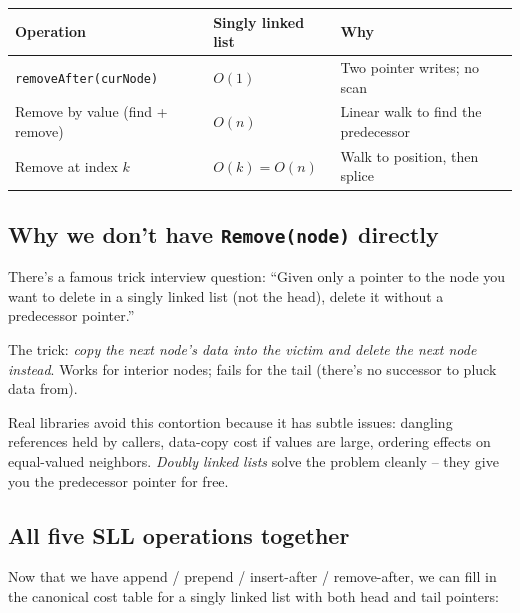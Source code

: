 \documentclass[11pt]{article}
\begin{document}
\begin{center}
\footnotesize
\renewcommand{\arraystretch}{1.3}
\begin{tabular}{@{}lll@{}}
\hline
\textbf{Operation}                & \textbf{Singly linked list} & \textbf{Why} \\
\hline
\texttt{removeAfter(curNode)}     & $O(1)$                      & Two pointer writes; no scan \\
Remove by value (find + remove)   & $O(n)$                      & Linear walk to find the predecessor \\
Remove at index $k$               & $O(k) = O(n)$               & Walk to position, then splice \\
\hline
\end{tabular}
\end{center}

\subsection{Why we don't have \texttt{Remove(node)} directly}

\begin{ideabox}
There's a famous trick interview question: ``Given only a pointer
to the node you want to delete in a singly linked list (not the
head), delete it without a predecessor pointer.''

The trick: \emph{copy the next node's data into the victim and
delete the next node instead}. Works for interior nodes; fails for
the tail (there's no successor to pluck data from).

Real libraries avoid this contortion because it has subtle issues:
dangling references held by callers, data-copy cost if values are
large, ordering effects on equal-valued neighbors. \emph{Doubly
linked lists} solve the problem cleanly -- they give you the
predecessor pointer for free.
\end{ideabox}

\subsection{All five SLL operations together}

Now that we have append / prepend / insert-after / remove-after,
we can fill in the canonical cost table for a singly linked list
with both head and tail pointers:
\end{document}
